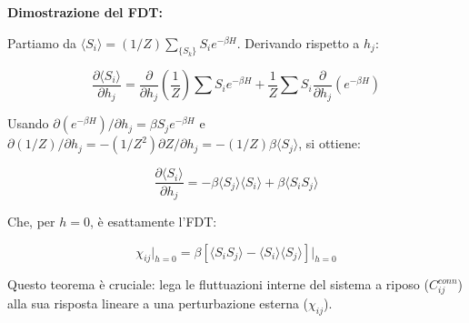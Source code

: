 \textbf{Dimostrazione del FDT:}

Partiamo da $\langle S_i \rangle = (1/Z) \sum_{\{S_k\}} S_i e^{-\beta H}$. Derivando rispetto a $h_j$:

\begin{equation} \label{eq:ch18_16}
\frac{\partial \langle S_i \rangle}{\partial h_j} = \frac{\partial}{\partial h_j} \left( \frac{1}{Z} \right) \sum S_i e^{-\beta H} + \frac{1}{Z} \sum S_i \frac{\partial}{\partial h_j} (e^{-\beta H})
\end{equation}

Usando $\partial(e^{-\beta H})/\partial h_j = \beta S_j e^{-\beta H}$ e $\partial(1/Z)/\partial h_j = -(1/Z^2) \partial Z/\partial h_j = -(1/Z) \beta \langle S_j \rangle$, si ottiene:

\begin{equation} \label{eq:ch18_17}
\frac{\partial \langle S_i \rangle}{\partial h_j} = -\beta \langle S_j \rangle \langle S_i \rangle + \beta \langle S_i S_j \rangle
\end{equation}

Che, per $h=0$, è esattamente l'FDT:

\begin{equation} \label{eq:ch18_18}
\chi_{ij}\bigg|_{h=0} = \beta [ \langle S_i S_j \rangle - \langle S_i \rangle \langle S_j \rangle ]\bigg|_{h=0}
\end{equation}

Questo teorema è cruciale: lega le fluttuazioni interne del sistema a riposo ($C_{ij}^{conn}$) alla sua risposta lineare a una perturbazione esterna ($\chi_{ij}$).
